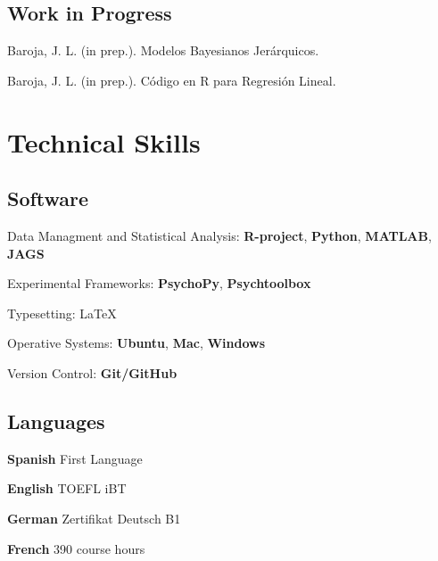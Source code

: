 \documentclass[letterpaper]{article}
\renewenvironment{itemize}{
  \begin{list}{}{
    \setlength{\leftmargin}{1.5em}
  }
}{
  \end{list}
}
\begin{document}
\subsection*{Work in Progress}
\begin{itemize}
\setlength\itemsep{-.25em}
\setlength{\itemindent}{-.125in}
	\item Baroja, J. L. (in prep.). Modelos Bayesianos Jerárquicos.
	\item Baroja, J. L. (in prep.). Código en R para Regresión Lineal.
\end{itemize}





\section*{Technical Skills}

\subsection*{Software}
\begin{itemize}
\setlength\itemsep{-.25em}
\setlength{\itemindent}{-.125in}
	\item Data Managment and Statistical Analysis: {\bf R-project}, {\bf Python}, {\bf MATLAB}, {\bf JAGS}
	\item Experimental Frameworks: {\bf PsychoPy}, {\bf Psychtoolbox}
	\item Typesetting: \LaTeX
	\item Operative Systems: {\bf Ubuntu}, {\bf Mac}, {\bf Windows}
	\item Version Control: {\bf Git/GitHub}
\end{itemize}

\subsection*{Languages}
\begin{itemize}
\setlength\itemsep{-.25em}
\setlength{\itemindent}{-.125in}
	\item{\bf Spanish} First Language
	\item{\bf English} TOEFL iBT
	\item{\bf German} Zertifikat Deutsch B1
	\item{\bf French} 390 course hours
\end{itemize}
\end{document}
